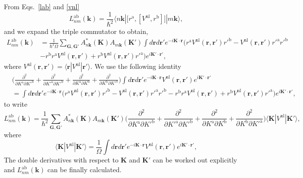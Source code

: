\documentclass[floatfix,prb,aps,superscriptaddress,showpacs,letterpaper]{revtex4}
\begin{document}
From Eqs.~\eqref{lab} and \eqref{vnl} 
\begin{equation*}
L^{\mathrm{a}\mathrm{b}}_{nm}(\mathbf{k}) 
=
\frac{1}{\hbar^2}
\langle n\mathbf{k} |
\big[ r^{\mathrm{a}},[ V^\mathrm{nl}, r^\mathrm{b}]\big]
| m\mathbf{k}\rangle
,
\end{equation*} 
and we expand the triple commutator to obtain,
\begin{align*}
L^{\mathrm{a}\mathrm{b}}_{nm}(\mathbf{k}) 
&=
\frac{1}{\hbar^2\Omega}
\sum_{\mathbf{G},\mathbf{G}'} 
A^*_{n\mathbf{k}}(\mathbf{K}) 
A_{m\mathbf{k}}(\mathbf{K}')
\int
d\mathbf{r} d\mathbf{r}'
 e^{-i\mathbf{K}\cdot\mathbf{r}}
\Big(
r^{\mathrm{a}}
V^\mathrm{nl}(\mathbf{r},\mathbf{r}')
r'^\mathrm{b}
-
V^\mathrm{nl}(\mathbf{r},\mathbf{r}')
r'^\mathrm{a}
r'^{\mathrm{b}}
\nonumber\\
&-
r^\mathrm{b}
r^{\mathrm{a}}
V^\mathrm{nl}(\mathbf{r},\mathbf{r}')
+
 r^\mathrm{b}
V^\mathrm{nl}(\mathbf{r},\mathbf{r}')
r'^{\mathrm{a}}
\Big) 
 e^{i\mathbf{K}'\cdot\mathbf{r}'}
,
\end{align*} 
where 
$V^\mathrm{nl}(\mathbf{r},\mathbf{r}') = \langle\mathbf{r} | V^\mathrm{nl} | \mathbf{r}'\rangle$.
We use the following identity
\begin{align*}
&
\Big(
\frac{\partial^2}{\partial K^\mathrm{a}\partial K'^\mathrm{b}}
+
\frac{\partial^2}{\partial K'^\mathrm{a}\partial K'^\mathrm{b}}
+
\frac{\partial^2}{\partial K^\mathrm{a}\partial K^\mathrm{b}}
+
\frac{\partial^2}{\partial K^\mathrm{b}\partial K'^\mathrm{a}}
\Big)
\int 
d\mathbf{r} d\mathbf{r}' 
 e^{-i\mathbf{K}\cdot\mathbf{r}}
V^\mathrm{nl}(\mathbf{r},\mathbf{r}') 
e^{i\mathbf{K}'\cdot\mathbf{r}'}
\nonumber\\
&=
\int d\mathbf{r} d\mathbf{r}'
 e^{-i\mathbf{K}\cdot\mathbf{r}}
\Big( 
r^{\mathrm{a}} 
V^\mathrm{nl}(\mathbf{r},\mathbf{r}') 
r'^\mathrm{b}
- 
V^\mathrm{nl}(\mathbf{r},\mathbf{r}') 
r'^\mathrm{a} 
r'^{\mathrm{b}}
- 
r^\mathrm{b} 
r^{\mathrm{a}} 
V^\mathrm{nl}(\mathbf{r},\mathbf{r}')
+
 r^\mathrm{b} 
V^\mathrm{nl}(\mathbf{r},\mathbf{r}') 
r'^{\mathrm{a}}
\Big)  
e^{i\mathbf{K}'\cdot\mathbf{r}'}
,
\end{align*}
to write
\begin{equation*}
L^{\mathrm{a}\mathrm{b}}_{nm}(\mathbf{k})
=
\frac{1}{\hbar^2}
\sum_{\mathbf{G},\mathbf{G}'} 
A^*_{n\mathbf{k}}(\mathbf{K}) 
A_{m\mathbf{k}}(\mathbf{K}')
\Big(
\frac{\partial^2}{\partial K^\mathrm{a}\partial K'^\mathrm{b}}
+
\frac{\partial^2}{\partial K'^\mathrm{a}\partial K'^\mathrm{b}}
+
\frac{\partial^2}{\partial K^\mathrm{a}\partial K^\mathrm{b}}
+
\frac{\partial^2}{\partial K^\mathrm{b}\partial K'^\mathrm{a}}
\Big)
\langle \mathbf{K} |
V^\mathrm{nl} 
| \mathbf{K}'\rangle,
\end{equation*} 
where
\begin{equation*}
\langle\mathbf{K} |
V^\mathrm{nl} 
| \mathbf{K}'\rangle
=
\frac{1}{\Omega}
\int 
d\mathbf{r} d\mathbf{r}' 
 e^{-i\mathbf{K}\cdot\mathbf{r}}
V^\mathrm{nl}(\mathbf{r},\mathbf{r}') 
e^{i\mathbf{K}'\cdot\mathbf{r}'}
,
\end{equation*}
The double derivatives with respect to $\mathbf{K}$ and $\mathbf{K}'$ 
can be worked out explicitly and 
$L^{\mathrm{a}\mathrm{b}}_{nm}(\mathbf{k})$
can be finally calculated.\cite{valerie}
\end{document}
